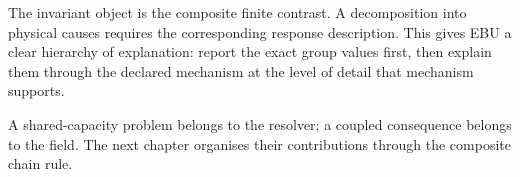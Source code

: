 The invariant object is the composite finite contrast. A decomposition into physical causes requires the corresponding response description. This gives EBU a clear hierarchy of explanation: report the exact group values first, then explain them through the declared mechanism at the level of detail that mechanism supports.

A shared-capacity problem belongs to the resolver; a coupled consequence belongs to the field. The next chapter organises their contributions through the composite chain rule.
